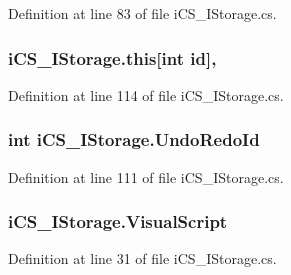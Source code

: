 Definition at line 83 of file i\+C\+S\+\_\+\+I\+Storage.\+cs.

\hypertarget{classi_c_s___i_storage_a529625888b06970683dc18b3de5cfa3a}{
\subsubsection[{this[int id]}]{ i\+C\+S\+\_\+\+I\+Storage.\+this\mbox{[}int id\mbox{]}\hspace{0.3cm}{\ttfamily [get]}, {\ttfamily [set]}}}\label{classi_c_s___i_storage_a529625888b06970683dc18b3de5cfa3a}


Definition at line 114 of file i\+C\+S\+\_\+\+I\+Storage.\+cs.

\hypertarget{classi_c_s___i_storage_af56b2357914d469351846e2bbf7af1a7}{
\subsubsection[{Undo\+Redo\+Id}]{\setlength{\rightskip}{0pt plus 5cm}int i\+C\+S\+\_\+\+I\+Storage.\+Undo\+Redo\+Id\hspace{0.3cm}{\ttfamily [get]}}}\label{classi_c_s___i_storage_af56b2357914d469351846e2bbf7af1a7}


Definition at line 111 of file i\+C\+S\+\_\+\+I\+Storage.\+cs.

\hypertarget{classi_c_s___i_storage_a8b5736e6de84005b894a63649b327fe0}{
\subsubsection[{Visual\+Script}]{ i\+C\+S\+\_\+\+I\+Storage.\+Visual\+Script\hspace{0.3cm}{\ttfamily [get]}}}\label{classi_c_s___i_storage_a8b5736e6de84005b894a63649b327fe0}


Definition at line 31 of file i\+C\+S\+\_\+\+I\+Storage.\+cs.



